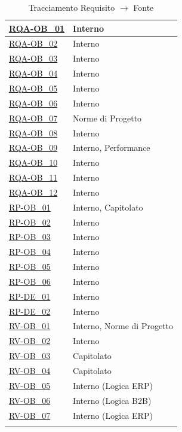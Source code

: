 \begin{longtable}{|>{\raggedright}p{}|>{\raggedright\arraybackslash}p{}|}
    \hyperlink{rqa-ob_1}{RQA-OB\_01} & Interno \\ \hline
    \hyperlink{rqa-ob_2}{RQA-OB\_02} & Interno \\ \hline
    \hyperlink{rqa-ob_3}{RQA-OB\_03} & Interno \\ \hline
    \hyperlink{rqa-ob_4}{RQA-OB\_04} & Interno \\ \hline
    \hyperlink{rqa-ob_5}{RQA-OB\_05} & Interno \\ \hline
    \hyperlink{rqa-ob_6}{RQA-OB\_06} & Interno \\ \hline
    \hyperlink{rqa-ob_7}{RQA-OB\_07} & Norme di Progetto \\ \hline
    \hyperlink{rqa-ob_8}{RQA-OB\_08} & Interno \\ \hline
    \hyperlink{rqa-ob_9}{RQA-OB\_09} & Interno, Performance \\ \hline
    \hyperlink{rqa-ob_10}{RQA-OB\_10} & Interno \\ \hline
    \hyperlink{rqa-ob_11}{RQA-OB\_11} & Interno \\ \hline
    \hyperlink{rqa-ob_12}{RQA-OB\_12} & Interno \\ \hline

    \hyperlink{rp-ob_1}{RP-OB\_01} & Interno, Capitolato \\ \hline
    \hyperlink{rp-ob_2}{RP-OB\_02} & Interno \\ \hline
    \hyperlink{rp-ob_3}{RP-OB\_03} & Interno \\ \hline
    \hyperlink{rp-ob_4}{RP-OB\_04} & Interno \\ \hline
    \hyperlink{rp-ob_5}{RP-OB\_05} & Interno \\ \hline
    \hyperlink{rp-ob_6}{RP-OB\_06} & Interno \\ \hline

    \hyperlink{rp-de_1}{RP-DE\_01} & Interno \\ \hline
    \hyperlink{rp-de_2}{RP-DE\_02} & Interno \\ \hline

    \hyperlink{rv-ob_1}{RV-OB\_01} & Interno, Norme di Progetto \\ \hline
    \hyperlink{rv-ob_2}{RV-OB\_02} & Interno \\ \hline
    \hyperlink{rv-ob_3}{RV-OB\_03} & Capitolato \\ \hline
    \hyperlink{rv-ob_4}{RV-OB\_04} & Capitolato \\ \hline
    \hyperlink{rv-ob_5}{RV-OB\_05} & Interno (Logica ERP) \\ \hline
    \hyperlink{rv-ob_6}{RV-OB\_06} & Interno (Logica B2B) \\ \hline
    \hyperlink{rv-ob_7}{RV-OB\_07} & Interno (Logica ERP) \\ \hline
    
    \caption{Tracciamento Requisito $\rightarrow$ Fonte}
\end{longtable}

